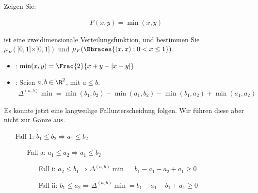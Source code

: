 
\begin{exercise}

Zeigen Sie:

\begin{align*}
  F(x, y) = \min(x, y)
\end{align*}

ist eine zweidimensionale Verteilungsfunktion, und bestimmen Sie $\mu_F(]0, 1] \times ]0, 1])$ und $\mu_F(\Bbraces{(x, x) : 0 < x \leq 1})$.

\end{exercise}


\begin{solution}

\phantom{}

\begin{itemize}

  \item {}: $\min(x, y) = \Frac{2}{x + y - |x - y|}$

  \item {}: Seien $a, b \in \R^2$, mit $a \leq b$.
  \begin{align*}
    \Delta^{(a, b)} \min
    =
    \min(b_1, b_2) - \min(a_1, b_2) - \min(b_1, a_2) + \min(a_1, a_2)
  \end{align*}

\end{itemize}

Es könnte jetzt eine langweilige Fallunterscheidung folgen. Wir führen diese aber nicht zur Gänze aus.

\begin{itemize}
  \item[Fall 1:] $b_1 \leq b_2 \Rightarrow a_1 \leq b_2$
  \begin{itemize}
    \item[Fall a:] $a_1 \leq a_2 \Rightarrow a_1 \leq b_2$
    \begin{itemize}
      \item[Fall i:] $a_2 \leq b_1 \Rightarrow
      \Delta^{(a, b)} \min = b_1 - a_1 - a_2 + a_1 \geq 0$
      \item[Fall ii:] $b_1 \leq a_2 \Rightarrow
      \Delta^{(a, b)} \min = b_1 - a_1 - b_1 + a_1 \geq 0$
    \end{itemize}
  \end{itemize}
\end{itemize}


\end{solution}
